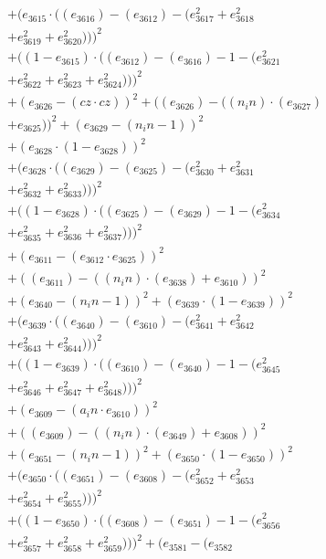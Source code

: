 \documentclass[10pt, a4paper]{article}
\begin{document}
\begin{small}
\begin{align*}
& + (e_{3615}  \cdot  ((e_{3616}) - (e_{3612}) - (e_{3617}^{2} + e_{3618}^{2} \\
& + e_{3619}^{2} + e_{3620}^{2})))^{2} \\
& + ((1 - e_{3615})  \cdot  ((e_{3612}) - (e_{3616}) - 1 - (e_{3621}^{2} \\
& + e_{3622}^{2} + e_{3623}^{2} + e_{3624}^{2})))^{2} \\
& + (e_{3626} - (cz  \cdot  cz))^{2} + ((e_{3626}) - ((n_in)  \cdot  (e_{3627}) \\
& + e_{3625}))^{2} + (e_{3629} - (n_in - 1))^{2} \\
& + (e_{3628}  \cdot  (1 - e_{3628}))^{2} \\
& + (e_{3628}  \cdot  ((e_{3629}) - (e_{3625}) - (e_{3630}^{2} + e_{3631}^{2} \\
& + e_{3632}^{2} + e_{3633}^{2})))^{2} \\
& + ((1 - e_{3628})  \cdot  ((e_{3625}) - (e_{3629}) - 1 - (e_{3634}^{2} \\
& + e_{3635}^{2} + e_{3636}^{2} + e_{3637}^{2})))^{2} \\
& + (e_{3611} - (e_{3612}  \cdot  e_{3625}))^{2} \\
& + ((e_{3611}) - ((n_in)  \cdot  (e_{3638}) + e_{3610}))^{2} \\
& + (e_{3640} - (n_in - 1))^{2} + (e_{3639}  \cdot  (1 - e_{3639}))^{2} \\
& + (e_{3639}  \cdot  ((e_{3640}) - (e_{3610}) - (e_{3641}^{2} + e_{3642}^{2} \\
& + e_{3643}^{2} + e_{3644}^{2})))^{2} \\
& + ((1 - e_{3639})  \cdot  ((e_{3610}) - (e_{3640}) - 1 - (e_{3645}^{2} \\
& + e_{3646}^{2} + e_{3647}^{2} + e_{3648}^{2})))^{2} \\
& + (e_{3609} - (a_in  \cdot  e_{3610}))^{2} \\
& + ((e_{3609}) - ((n_in)  \cdot  (e_{3649}) + e_{3608}))^{2} \\
& + (e_{3651} - (n_in - 1))^{2} + (e_{3650}  \cdot  (1 - e_{3650}))^{2} \\
& + (e_{3650}  \cdot  ((e_{3651}) - (e_{3608}) - (e_{3652}^{2} + e_{3653}^{2} \\
& + e_{3654}^{2} + e_{3655}^{2})))^{2} \\
& + ((1 - e_{3650})  \cdot  ((e_{3608}) - (e_{3651}) - 1 - (e_{3656}^{2} \\
& + e_{3657}^{2} + e_{3658}^{2} + e_{3659}^{2})))^{2} + (e_{3581} - (e_{3582} \\

\end{align*}
\end{small}
\end{document}
